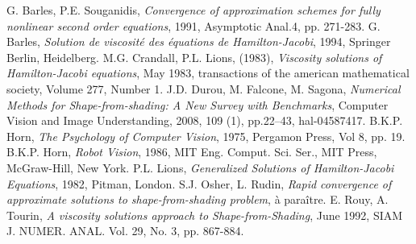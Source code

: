 \begin{thebibliography}{MMM99}
    G. Barles, P.E. Souganidis, \textit{Convergence of approximation schemes for fully nonlinear second
order equations}, 1991, Asymptotic Anal.4, pp. 271-283.
    G. Barles, \textit{Solution de viscosité des équations de Hamilton-Jacobi}, 1994, Springer Berlin, Heidelberg. 
    M.G. Crandall, P.L. Lions, (1983), \textit{Viscosity solutions of Hamilton-Jacobi equations}, May 1983, transactions of the american mathematical society, Volume 277, Number 1.
    J.D. Durou, M. Falcone, M. Sagona, \textit{Numerical Methods for Shape-from-shading: A New Survey with Benchmarks}, Computer Vision and Image Understanding, 2008, 109 (1), pp.22–43, hal-04587417.
    B.K.P. Horn, \textit{The Psychology of Computer Vision}, 1975, Pergamon Press, Vol 8, pp. 19.
    B.K.P. Horn, \textit{Robot Vision}, 1986, MIT Eng. Comput. Sci. Ser., MIT Press, McGraw-Hill, New York.
    P.L. Lions, \textit{Generalized Solutions of Hamilton-Jacobi Equations}, 1982, Pitman, London.
    S.J. Osher, L. Rudin, \textit{Rapid convergence of approximate solutions to shape-from-shading problem}, à paraître.
    E. Rouy, A. Tourin, \textit{A viscosity solutions approach to Shape-from-Shading}, June 1992, SIAM J. NUMER. ANAL. Vol. 29, No. 3, pp. 867-884.
\end{thebibliography}